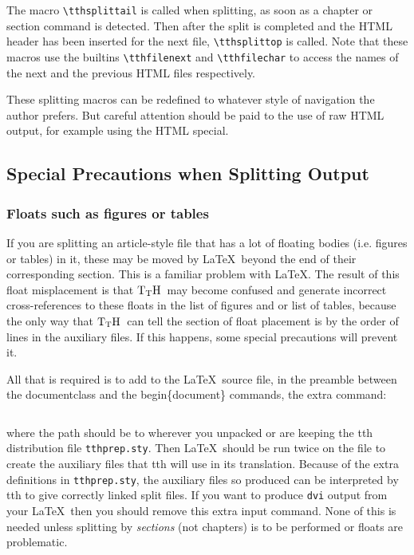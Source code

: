 \documentclass[12pt]{article}
\def\TtH{$\rm{}T_TH$}
\begin{document}
The macro \verb!\tthsplittail! is called when splitting, as soon as a
chapter or section command is detected. Then after the split is
completed and the HTML header has been inserted for the next file,
\verb!\tthsplittop! is called. Note that these macros use the
builtins \verb!\tthfilenext! and \verb!\tthfilechar! to access the
names of the next and the previous HTML files respectively.

These splitting macros can be redefined to whatever style of
navigation the author prefers. But careful attention should be paid to
the use of raw HTML output, for example using the HTML special.


\subsection{Special Precautions when Splitting Output}

\subsubsection{Floats such as figures or tables}
If you are splitting an article-style file that has a lot of
floating bodies (i.e. figures or tables) in it, these may be moved by
\LaTeX\ beyond the end of their corresponding section. This is a
familiar problem with \LaTeX. The result of this float misplacement
is that \TtH\ may become confused and generate incorrect
cross-references to these floats in the list of figures and or list of
tables, because the only way that \TtH\ can tell the section of float
placement is by the order of lines in the auxiliary files. If this
happens, some special precautions will prevent it. 

All that is required is to add to the \LaTeX\ source file, in the
preamble between the documentclass and the begin\{document\} commands,
the extra command:

\begin{verbatim}

\end{verbatim}

\noindent where the path should be to wherever you unpacked or are
keeping the tth distribution file \verb!tthprep.sty!. Then \LaTeX\ should
be run twice on the file to create the auxiliary files that tth will
use in its translation. Because of the extra definitions in
\verb!tthprep.sty!, the auxiliary files so produced can be interpreted by
tth to give correctly linked split files. If you want to produce
\verb!dvi! output from your \LaTeX\ then you should remove this extra
input command.  None of this is needed unless splitting by {\em
sections\/} (not chapters) is to be performed or floats are
problematic.
\end{document}
